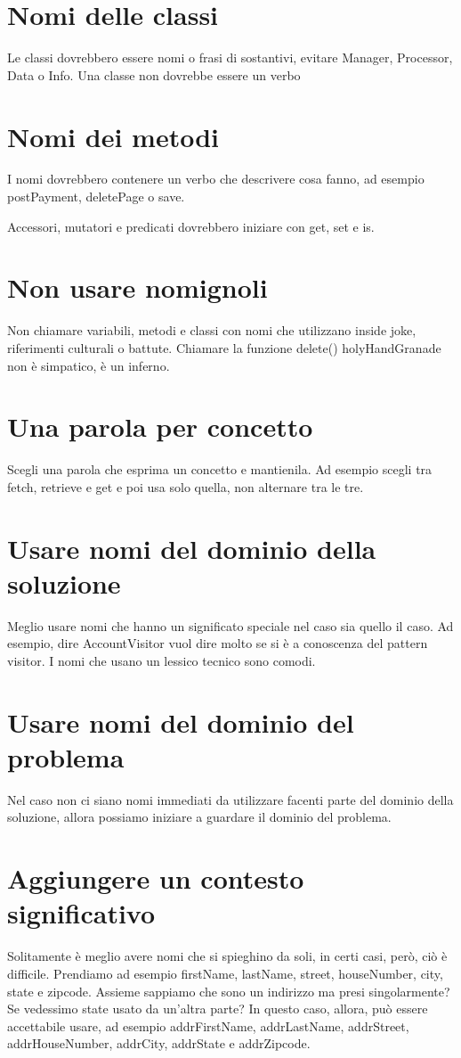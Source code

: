 \documentclass[11pt,a4paper]{book}
\begin{document}
\section{Nomi delle classi}
Le classi dovrebbero essere nomi o frasi di sostantivi, evitare Manager, Processor, Data o Info. Una classe non dovrebbe essere un verbo

\section{Nomi dei metodi}
I nomi dovrebbero contenere un verbo che descrivere cosa fanno, ad esempio postPayment, deletePage o save.

Accessori, mutatori e predicati dovrebbero iniziare con get, set e is.

\section{Non usare nomignoli}
Non chiamare variabili, metodi e classi con nomi che utilizzano inside joke, riferimenti culturali o battute. Chiamare la funzione delete() holyHandGranade non è simpatico, è un inferno.

\section{Una parola per concetto}
Scegli una parola che esprima un concetto e mantienila. Ad esempio scegli tra fetch, retrieve e get e poi usa solo quella, non alternare tra le tre.

\section{Usare nomi del dominio della soluzione}
Meglio usare nomi che hanno un significato speciale nel caso sia quello il caso. Ad esempio, dire AccountVisitor vuol dire molto se si è a conoscenza del pattern visitor. I nomi che usano un lessico tecnico sono comodi.

\section{Usare nomi del dominio del problema}
Nel caso non ci siano nomi immediati da utilizzare facenti parte del dominio della soluzione, allora possiamo iniziare a guardare il dominio del problema.

\section{Aggiungere un contesto significativo}
Solitamente è meglio avere nomi che si spieghino da soli, in certi casi, però, ciò è difficile. Prendiamo ad esempio firstName, lastName, street, houseNumber, city, state e zipcode. Assieme sappiamo che sono un indirizzo ma presi singolarmente? Se vedessimo state usato da un'altra parte? In questo caso, allora, può essere accettabile usare, ad esempio addrFirstName, addrLastName, addrStreet, addrHouseNumber, addrCity, addrState e addrZipcode.
\end{document}
